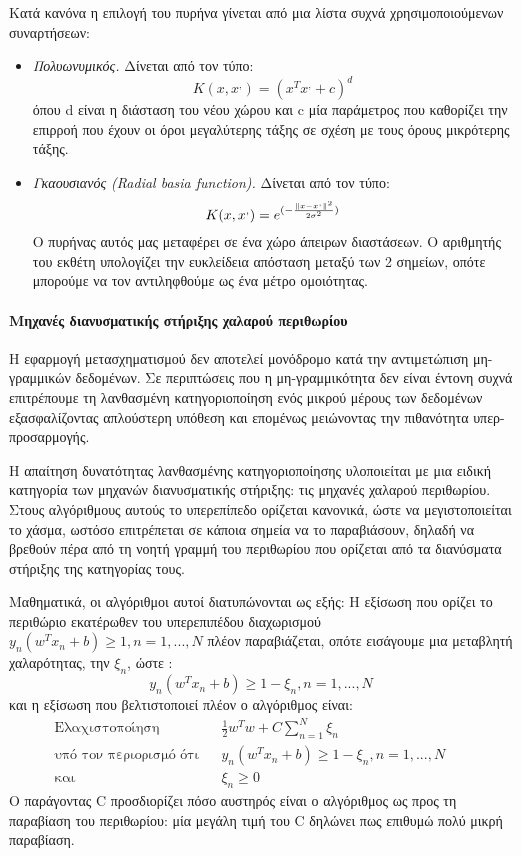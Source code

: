 		Κατά κανόνα η επιλογή του πυρήνα γίνεται από μια λίστα συχνά χρησιμοποιούμενων συναρτήσεων:
		\begin{itemize}
			\item \textit{Πολυωνυμικός.} Δίνεται από τον τύπο:
			\begin{equation}
			K(x, x^,)= (x^T x^, + c)^d
			\end{equation}
			όπου d είναι η διάσταση του νέου χώρου και c μία παράμετρος που καθορίζει την επιρροή που έχουν οι όροι μεγαλύτερης τάξης σε σχέση με τους όρους μικρότερης τάξης.
			\item \textit{Γκαουσιανός (Radial basia function).} Δίνεται από τον τύπο:
		\begin{equation}
		K(x, x^,)= e^{(-\frac{\left\lVert x-x^,\right\rVert^2}{2 \sigma ^2})}
		\end{equation}
			Ο πυρήνας αυτός μας μεταφέρει σε ένα χώρο άπειρων διαστάσεων. Ο αριθμητής του εκθέτη υπολογίζει την ευκλείδεια απόσταση μεταξύ των 2 σημείων, οπότε μπορούμε να τον αντιληφθούμε ως ένα μέτρο ομοιότητας.
		\end{itemize}
		\paragraph{Μηχανές διανυσματικής στήριξης χαλαρού περιθωρίου} Η εφαρμογή μετασχηματισμού δεν αποτελεί μονόδρομο κατά την αντιμετώπιση μη-γραμμικών δεδομένων. Σε περιπτώσεις που η μη-γραμμικότητα δεν είναι έντονη συχνά επιτρέπουμε τη λανθασμένη κατηγοριοποίηση ενός μικρού μέρους των δεδομένων εξασφαλίζοντας απλούστερη υπόθεση και επομένως μειώνοντας την πιθανότητα υπερ-προσαρμογής.
		
		Η απαίτηση δυνατότητας λανθασμένης κατηγοριοποίησης υλοποιείται με μια ειδική κατηγορία των μηχανών διανυσματικής στήριξης: τις μηχανές χαλαρού περιθωρίου. Στους αλγόριθμους αυτούς το υπερεπίπεδο ορίζεται κανονικά, ώστε να μεγιστοποιείται το χάσμα, ωστόσο επιτρέπεται σε κάποια σημεία να το παραβιάσουν, δηλαδή να βρεθούν πέρα από τη νοητή γραμμή του περιθωρίου που ορίζεται από τα διανύσματα στήριξης της κατηγορίας τους.
		
		
		Μαθηματικά, οι αλγόριθμοι αυτοί διατυπώνονται ως εξής: Η εξίσωση που ορίζει το περιθώριο εκατέρωθεν του υπερεπιπέδου διαχωρισμού $y_n (w^T x_n + b) \geq 1, n=1,..., N$ πλέον παραβιάζεται, οπότε εισάγουμε μια μεταβλητή χαλαρότητας, την $\xi_n$, ώστε :
		\begin{equation}
		y_n (w^T x_n + b) \geq 1 - \xi_n, n=1, ..., N
		\end{equation}
		και η εξίσωση που βελτιστοποιεί πλέον ο αλγόριθμος είναι:
		\begin{align}
		\text{Ελαχιστοποίηση} && \frac{1}{2} w^T w + C \sum_{n=1}^{N} \xi_n  &&\\
		\text{υπό τον περιορισμό ότι} &&y_n (w^T x_n + b) \geq 1 - \xi_n, n=1, ..., N  &&\\
		\text{και} && \xi_n \geq 0  &&
		\end{align}
		Ο παράγοντας C προσδιορίζει πόσο αυστηρός είναι ο αλγόριθμος ως προς τη παραβίαση του περιθωρίου: μία μεγάλη τιμή του C δηλώνει πως επιθυμώ πολύ μικρή παραβίαση.